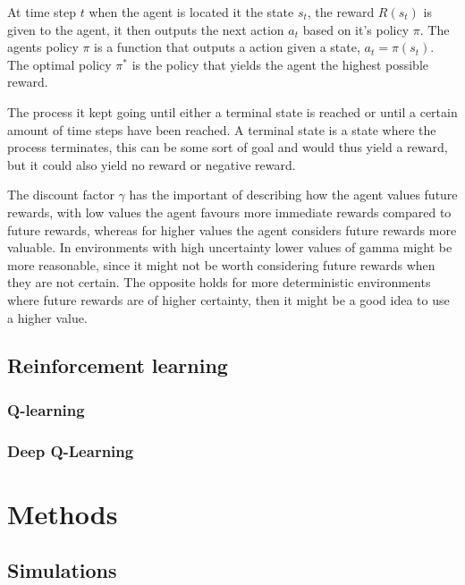 \documentclass[12pt,A4]{report}
\theoremstyle{definition}
\begin{document}
At time step $t$ when the agent is located it the state $s_t$, the reward $R(s_t)$ is given to the agent, it then outputs the next action $a_t$ based on it's policy $\pi$. The agents policy $\pi$ is a function that outputs a action given a state, $a_t = \pi(s_t)$. The optimal policy $\pi^*$ is the policy that yields the agent the highest possible reward. 

The process it kept going until either a terminal state is reached or until a certain amount of time steps have been reached. A terminal state is a state where the process terminates, this can be some sort of goal and would thus yield a reward, but it could also yield no reward or negative reward.

The discount factor $\gamma$ has the important of describing how the agent values future rewards, with low values the agent favours more immediate rewards compared to future rewards, whereas for higher values the agent considers future rewards more valuable. In environments with high uncertainty lower values of gamma might be more reasonable, since it might not be worth considering future rewards when they are not certain. The opposite holds for more deterministic environments where future rewards are of higher certainty, then it might be a good idea to use a higher value.


\section{Reinforcement learning}

\subsection{Q-learning}

\subsection{Deep Q-Learning}





\chapter{Methods}

\section{Simulations}
\end{document}
